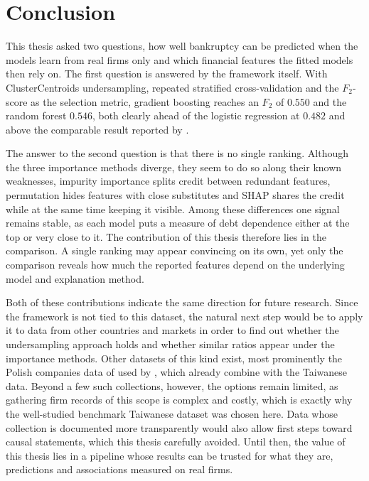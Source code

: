 \clearpage
\chapter{Conclusion}
\label{ch:conclusion}

This thesis asked two questions, how well bankruptcy can be predicted when the
models learn from real firms only and which financial features the fitted
models then rely on. The first question is answered by the framework itself.
With ClusterCentroids undersampling, repeated stratified cross-validation and
the $F_2$-score as the selection metric, gradient boosting reaches an $F_2$ of
$0.550$ and the random forest $0.546$, both clearly ahead of the logistic
regression at $0.482$ and above the comparable result reported by
\textcite{wangliu2021}.

The answer to the second question is that there is no single ranking. 
Although the three importance methods diverge, they seem to do so along 
their known weaknesses, impurity importance splits credit between redundant 
features, permutation hides features with close substitutes and SHAP shares 
the credit while at the same time keeping it visible. Among these differences 
one signal remains stable, as each model puts a measure of debt dependence 
either at the top or very close to it. The contribution of this thesis therefore 
lies in the comparison. A single ranking may appear convincing on its own, yet 
only the comparison reveals how much the reported features depend on 
the underlying model and explanation method.

Both of these contributions indicate the same direction for future research. Since
the framework is not tied to this dataset, the natural next step would be to apply
it to data from other countries and markets in order to find out whether the
undersampling approach holds and whether similar ratios appear under the importance
methods. Other datasets of this kind exist, most prominently the Polish companies
data of \textcite{uci_polish} used by \textcite{amirshahi2024},
which \textcite{ansahnarh2024} already combine with the Taiwanese data. Beyond a few
such collections, however, the options remain limited, as gathering firm records of
this scope is complex and costly, which is exactly why the well-studied benchmark
Taiwanese dataset was chosen here. Data whose collection is documented more
transparently would also allow first steps toward causal statements, which this
thesis carefully avoided. Until then, the value of this thesis lies in a pipeline
whose results can be trusted for what they are, predictions and associations
measured on real firms.